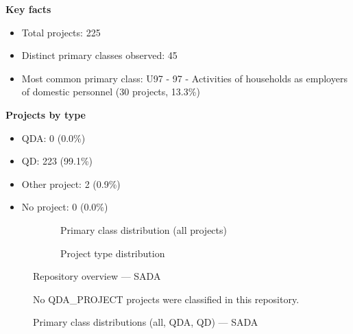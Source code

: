 \textbf{Key facts}

\begin{itemize}
    \item Total projects: 225
    \item Distinct primary classes observed: 45
    \item Most common primary class: U97 - 97 - Activities of households as employers of domestic personnel (30 projects, 13.3\%)
\end{itemize}

\textbf{Projects by type}

\begin{itemize}
    \item QDA: 0 (0.0\%)
    \item QD: 223 (99.1\%)
    \item Other project: 2 (0.9\%)
    \item No project: 0 (0.0\%)
\end{itemize}

\begin{figure}[H]
    \centering
    \begin{subfigure}[t]{0.49\textwidth}
        \centering
        
        \caption{Primary class distribution (all projects)}
    \end{subfigure}
    \hfill
    \begin{subfigure}[t]{0.49\textwidth}
        \centering
        
        \caption{Project type distribution}
    \end{subfigure}
    \caption{Repository overview --- SADA}
\end{figure}

\clearpage

\begin{figure}[H]
    \centering
    
    \par\vspace{0.8em}
    No QDA\_PROJECT projects were classified in this repository.
    \par\vspace{0.8em}
    
    \caption{Primary class distributions (all, QDA, QD) --- SADA}
\end{figure}

\clearpage

